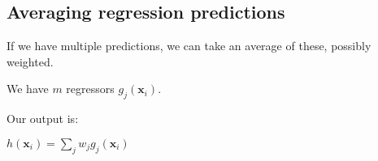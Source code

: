 
\subsection{Averaging regression predictions}

If we have multiple predictions, we can take an average of these, possibly weighted.

We have \(m\) regressors \(g_j(\mathbf x_i)\).

Our output is:

\(h(\mathbf x_i)=\sum_j w_jg_j(\mathbf x_i)\)

